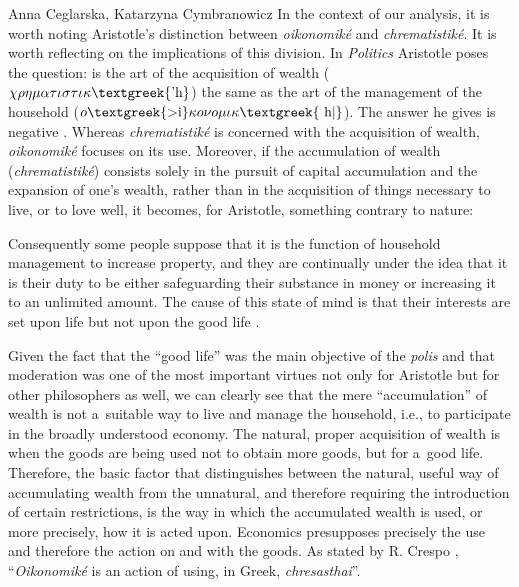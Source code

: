 \begin{artengenv2auth}{Anna Ceglarska, Katarzyna Cymbranowicz}
In the context of our analysis, it is worth noting Aristotle's distinction between \textit{oikonomiké} and \textit{chrematistiké}. It is worth reflecting on the implications of this division. In \textit{Politics} Aristotle poses the question: is the art of the acquisition of wealth ($\chi \rho \eta \mu \alpha \tau \iota \sigma \tau \iota \kappa \text{\textgreek{'h}}$) the same as the art of the management of the household ($o\text{\textgreek{>i}}\kappa o\nu o\mu \iota \kappa \text{\textgreek{~h|}}$). The answer he gives is negative 
\parencite[][1.1256a]{aristotle_politics_1944}. %
 Whereas \textit{chrematistiké} is concerned with the acquisition of wealth, \textit{oikonomiké} focuses on its use. Moreover, if the accumulation of wealth (\textit{chrematistiké}) consists solely in the pursuit of capital accumulation and the expansion of one's wealth, rather than in the acquisition of things necessary to live, or to love well, it becomes, for Aristotle, something contrary to nature:



Consequently some people suppose that it is the function of household management to increase property, and they are continually under the idea that it is their duty to be either safeguarding their substance in money or increasing it to an unlimited amount. The cause of this state of mind is that their interests are set upon life but not upon the good life 
\parencite[][1.1257b]{aristotle_politics_1944}.%




Given the fact that the ``good life'' was the main objective of the \textit{polis} and that moderation was one of the most important virtues not only for Aristotle but for other philosophers as well, we can clearly see that the mere ``accumulation'' of wealth is not a~suitable way to live and manage the household, i.e., to participate in the broadly understood economy. The natural, proper acquisition of wealth is when the goods are being used not to obtain more goods, but for a~good life. Therefore, the basic factor that distinguishes between the natural, useful way of accumulating wealth from the unnatural, and therefore requiring the introduction of certain restrictions, is the way in which the accumulated wealth is used, or more precisely, how it is acted upon. Economics presupposes precisely the use and therefore the action on and with the goods. As stated by R. Crespo 
\parencite*[][p.772]{crespo_ontology_2006}, %
 ``\textit{Oikonomiké} is an action of using, in Greek, \textit{chresasthai}''.




\end{artengenv2auth}
